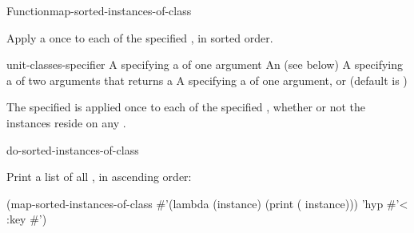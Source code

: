 \documentclass[10pt,twoside,english,pdftex]{article}
\begin{document}

\begin{functiondoc}{Function}{map-sorted-instances-of-class}%
  {
    }
%
%

\fnsyntax

\fnpurpose Apply a  once to each 
of the specified , in sorted order.

\fnpackage {}

\fnmodule {}

\fnargs
\begin{args}{unit-classes-specifier}
\arg[function] A  specifying a
  of one argument
 An 
(see below)
\arg[predicate] A  specifying a
 of two arguments that returns a
\arg[key] A  specifying a 
of one argument, or \nil{} (default is \nil)

\end{args}

\fndsyntax
\W\supp\tabletop
\unitclassesspec
\subclassingspec

\fndescription  The specified  is applied once to each
 of the specified , whether
or not the instances reside on any .

\begin{alsos}{do-sorted-instances-of-class}
\end{alsos}

\fnexample
Print a list of all  , in ascending order:
%
\W\supp
\begin{example}
  (map-sorted-instances-of-class 
     #'(lambda (instance)
         (print ( instance)))
     'hyp #'< :key #')
\end{example} 

\end{functiondoc}
\end{document}
